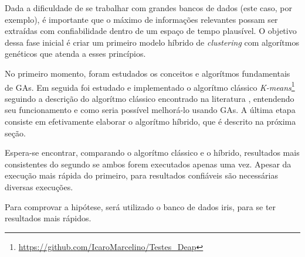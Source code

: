 Dada a dificuldade de se trabalhar com grandes bancos de dados (este caso, por exemplo), é importante que o máximo de informações relevantes possam ser extraídas com confiabilidade dentro de um espaço de tempo plausível. O objetivo dessa fase inicial é criar um primeiro modelo híbrido de {\it clustering} com algorítmos genéticos que atenda a esses princípios.

No primeiro momento, foram estudados os conceitos e algorítmos fundamentais de GAs. Em seguida foi estudado e implementado o algorítmo clássico {\it K-means}\footnote[1]{\url{https://github.com/IcaroMarcelino/Testes_Deap}} seguindo a descrição do algorítmo clássico encontrado na literatura \cite{data_clustering}, entendendo seu funcionamento e como seria possível melhorá-lo usando GAs. A última etapa consiste em efetivamente elaborar o algorítmo híbrido, que é descrito na próxima seção.

Espera-se encontrar, comparando o algorítmo clássico e o híbrido, resultados mais consistentes do segundo se ambos forem executados apenas uma vez. Apesar da execução mais rápida do primeiro, para resultados confiáveis são necessárias diversas execuções. 

Para comprovar a hipótese, será utilizado o banco de dados iris, para se ter resultados mais rápidos.